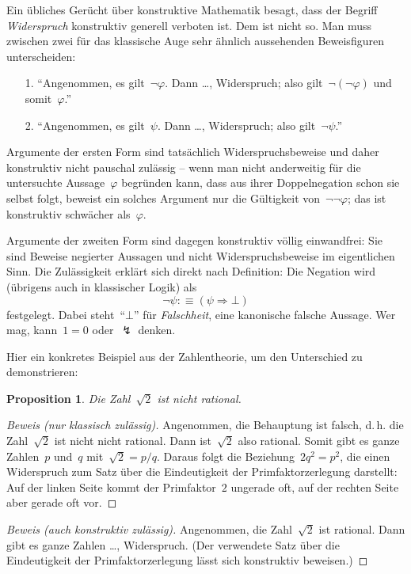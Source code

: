 \documentclass[a4paper,ngerman,12pt]{scrartcl}
\theoremstyle{definition}
\theoremstyle{plain}
\newtheorem{prop}[defn]{Proposition}
\theoremstyle{remark}
\renewcommand{\_}{\mathpunct{.}\,}
\newcommand{\?}{\,{:}\,}
\begin{document}
Ein übliches Gerücht über konstruktive Mathematik besagt, dass der Begriff
\emph{Widerspruch} konstruktiv generell verboten ist. Dem ist nicht so. Man
muss zwischen zwei für das klassische Auge sehr ähnlich aussehenden
Beweisfiguren unterscheiden:
\begin{enumerate}
\item[1.] "`Angenommen, es gilt~$\neg\varphi$. Dann \ldots, Widerspruch; also
gilt~$\neg(\neg\varphi)$ und somit~$\varphi$."'
\item[2.] "`Angenommen, es gilt~$\psi$. Dann \ldots, Widerspruch; also
gilt~$\neg\psi$."'
\end{enumerate}
Argumente der ersten Form sind tatsächlich Widerspruchsbeweise und daher
konstruktiv nicht pauschal zulässig -- wenn man nicht anderweitig für die
untersuchte Aussage~$\varphi$ begründen
kann, dass aus ihrer Doppelnegation schon sie selbst folgt, beweist ein
solches Argument nur die Gültigkeit von~$\neg\neg\varphi$; das ist konstruktiv
schwächer als~$\varphi$.

Argumente der zweiten Form sind dagegen konstruktiv völlig einwandfrei: Sie
sind Beweise negierter Aussagen und nicht Widerspruchsbeweise im eigentlichen
Sinn. Die Zulässigkeit erklärt sich direkt nach Definition:
Die Negation wird (übrigens auch in klassischer Logik) als
\[ \neg\psi :\equiv (\psi \Rightarrow \bot) \]
festgelegt. Dabei steht~"`$\bot$"' für \emph{Falschheit}, eine kanonische falsche
Aussage. Wer mag, kann~$1 = 0$ oder~$\lightning$ denken.

Hier ein konkretes Beispiel aus der Zahlentheorie, um den Unterschied zu
demonstrieren:
\begin{prop}Die Zahl~$\sqrt{2}$ ist nicht rational.\end{prop}
\begin{proof}[Beweis (nur klassisch zulässig)]
Angenommen, die Behauptung ist falsch, d.\,h. die Zahl~$\sqrt{2}$ ist nicht
nicht rational. Dann ist~$\sqrt{2}$ also rational. Somit gibt es ganze
Zahlen~$p$ und~$q$ mit~$\sqrt{2} = p / q$. Daraus folgt die Beziehung~$2q^2 =
p^2$, die einen Widerspruch zum Satz über die Eindeutigkeit der
Primfaktorzerlegung darstellt: Auf der linken Seite kommt der Primfaktor~$2$
ungerade oft, auf der rechten Seite aber gerade oft vor.
\end{proof}
\begin{proof}[Beweis (auch konstruktiv zulässig)]
Angenommen, die Zahl~$\sqrt{2}$ ist rational. Dann gibt es ganze Zahlen \ldots,
Widerspruch. (Der verwendete Satz über die Eindeutigkeit der
Primfaktorzerlegung lässt sich konstruktiv beweisen.)
\end{proof}
\end{document}
